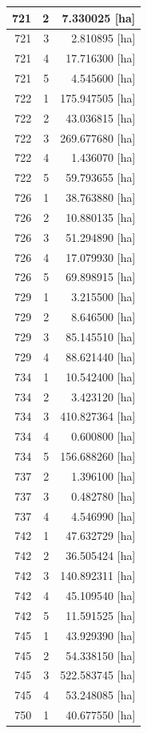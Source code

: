 \documentclass[11pt,]{book}
\begin{document}
\begin{table}
\begin{tabular}[t]{r|r|r}
\hline
721 & 2 & 7.330025 [ha]\\
\hline
721 & 3 & 2.810895 [ha]\\
\hline
721 & 4 & 17.716300 [ha]\\
\hline
721 & 5 & 4.545600 [ha]\\
\hline
722 & 1 & 175.947505 [ha]\\
\hline
722 & 2 & 43.036815 [ha]\\
\hline
722 & 3 & 269.677680 [ha]\\
\hline
722 & 4 & 1.436070 [ha]\\
\hline
722 & 5 & 59.793655 [ha]\\
\hline
726 & 1 & 38.763880 [ha]\\
\hline
726 & 2 & 10.880135 [ha]\\
\hline
726 & 3 & 51.294890 [ha]\\
\hline
726 & 4 & 17.079930 [ha]\\
\hline
726 & 5 & 69.898915 [ha]\\
\hline
729 & 1 & 3.215500 [ha]\\
\hline
729 & 2 & 8.646500 [ha]\\
\hline
729 & 3 & 85.145510 [ha]\\
\hline
729 & 4 & 88.621440 [ha]\\
\hline
734 & 1 & 10.542400 [ha]\\
\hline
734 & 2 & 3.423120 [ha]\\
\hline
734 & 3 & 410.827364 [ha]\\
\hline
734 & 4 & 0.600800 [ha]\\
\hline
734 & 5 & 156.688260 [ha]\\
\hline
737 & 2 & 1.396100 [ha]\\
\hline
737 & 3 & 0.482780 [ha]\\
\hline
737 & 4 & 4.546990 [ha]\\
\hline
742 & 1 & 47.632729 [ha]\\
\hline
742 & 2 & 36.505424 [ha]\\
\hline
742 & 3 & 140.892311 [ha]\\
\hline
742 & 4 & 45.109540 [ha]\\
\hline
742 & 5 & 11.591525 [ha]\\
\hline
745 & 1 & 43.929390 [ha]\\
\hline
745 & 2 & 54.338150 [ha]\\
\hline
745 & 3 & 522.583745 [ha]\\
\hline
745 & 4 & 53.248085 [ha]\\
\hline
750 & 1 & 40.677550 [ha]\\

\end{tabular}
\end{table}
\end{document}
